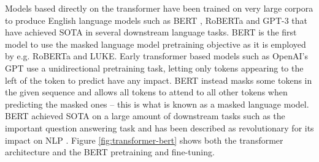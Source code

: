 \documentclass[main.tex]{subfiles}
\begin{document}
Models based directly on the transformer have been trained on very large corpora to produce English language models such as BERT \cite{devlin2019bert}, RoBERTa \cite{liu2019roberta} and GPT-3 \cite{brown2020language} that have achieved SOTA in several downstream language tasks.
BERT is the first model to use the masked language model pretraining objective as it is employed by e.g. RoBERTa and LUKE.
Early transformer based models such as OpenAI's GPT \cite{rashford2018gpt} use a unidirectional pretraining task, letting only tokens appearing to the left of the token to predict have any impact.
BERT instead masks some tokens in the given sequence and allows all tokens to attend to all other tokens when predicting the masked ones -- this is what is known as a masked language model.
BERT achieved SOTA on a large amount of downstream tasks such as the important question answering task and has been described as revolutionary for its impact on NLP \cite{raj2019bert}.
Figure \ref{fig:transformer-bert} shows both the transformer architecture and the BERT pretraining and fine-tuning.
\end{document}
